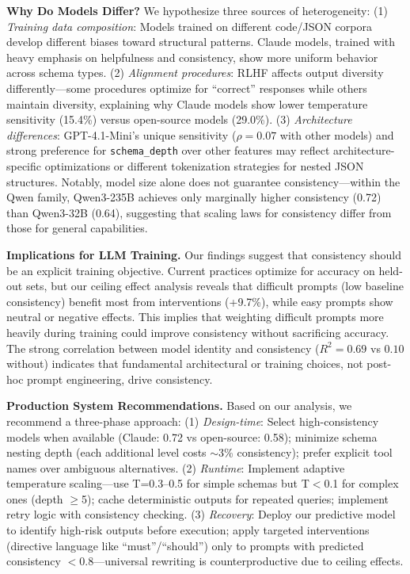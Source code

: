 \documentclass[sigconf,anonymous,review]{acmart}
\begin{document}
\textbf{Why Do Models Differ?} We hypothesize three sources of heterogeneity: (1) \textit{Training data composition}: Models trained on different code/JSON corpora develop different biases toward structural patterns. Claude models, trained with heavy emphasis on helpfulness and consistency, show more uniform behavior across schema types. (2) \textit{Alignment procedures}: RLHF affects output diversity differently---some procedures optimize for ``correct'' responses while others maintain diversity, explaining why Claude models show lower temperature sensitivity (15.4\%) versus open-source models (29.0\%). (3) \textit{Architecture differences}: GPT-4.1-Mini's unique sensitivity ($\rho=0.07$ with other models) and strong preference for \texttt{schema\_depth} over other features may reflect architecture-specific optimizations or different tokenization strategies for nested JSON structures. Notably, model size alone does not guarantee consistency---within the Qwen family, Qwen3-235B achieves only marginally higher consistency (0.72) than Qwen3-32B (0.64), suggesting that scaling laws for consistency differ from those for general capabilities.

\textbf{Implications for LLM Training.} Our findings suggest that consistency should be an explicit training objective. Current practices optimize for accuracy on held-out sets, but our ceiling effect analysis reveals that difficult prompts (low baseline consistency) benefit most from interventions (+9.7\%), while easy prompts show neutral or negative effects. This implies that weighting difficult prompts more heavily during training could improve consistency without sacrificing accuracy. The strong correlation between model identity and consistency ($R^2=0.69$ vs $0.10$ without) indicates that fundamental architectural or training choices, not post-hoc prompt engineering, drive consistency.

\textbf{Production System Recommendations.} Based on our analysis, we recommend a three-phase approach: (1) \textit{Design-time}: Select high-consistency models when available (Claude: 0.72 vs open-source: 0.58); minimize schema nesting depth (each additional level costs $\sim$3\% consistency); prefer explicit tool names over ambiguous alternatives. (2) \textit{Runtime}: Implement adaptive temperature scaling---use T=0.3--0.5 for simple schemas but T$<$0.1 for complex ones (depth $\geq$5); cache deterministic outputs for repeated queries; implement retry logic with consistency checking. (3) \textit{Recovery}: Deploy our predictive model to identify high-risk outputs before execution; apply targeted interventions (directive language like ``must''/``should'') only to prompts with predicted consistency $<0.8$---universal rewriting is counterproductive due to ceiling effects.
\end{document}
